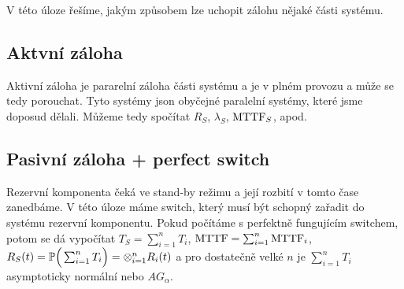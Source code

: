 
    V této úloze řešíme, jakým způsobem lze uchopit zálohu nějaké části systému.

    \subsection*{Aktvní záloha}
    
    Aktivní záloha je pararelní záloha části systému a je v plném provozu a může se tedy porouchat. Tyto systémy json obyčejné paralelní systémy, které jsme doposud dělali. Můžeme tedy spočítat $R_S$, $\lambda_S$, $\mathrm{MTTF}_S$, apod.
    
    \subsection*{Pasivní záloha + perfect switch}
    
    Rezervní komponenta čeká ve stand-by režimu a její rozbití v tomto čase zanedbáme. V této úloze máme switch, který musí být schopný zařadit do systému rezervní komponentu.
    Pokud počítáme s perfektně fungujícím switchem, potom se dá vypočítat $T_S = \sum_{i=1}^n T_i$, $\mathrm{MTTF} = \sum_{i=1}^n \mathrm{MTTF}_i$, $R_S(t) = \mathbb{P}\Big(\sum_{i=1}^n T_i\Big) = \otimes_{i=1}^n R_i(t)$ a pro dostatečně velké $n$ je $\sum_{i=1}^n T_i $ asymptoticky normální nebo $AG_{\alpha}$.
    
